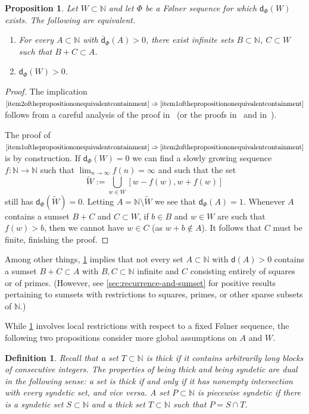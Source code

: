\documentclass[10pt,dvipsnames]{article}
\newtheorem{proposition}[theorem]{Proposition}
\newtheorem{definition}[theorem]{Definition}
\theoremstyle{definition}
\theoremstyle{plain}
\newcommand{\define}[1]{\textit{#1}}
\newcommand{\N}{\mathbb{N}}
\newcommand{\dens}{\mathsf{d}}
\newcommand{\udens}{\overline{\mathsf{d}}}
\newcommand{\Folner}{F\o{}lner}
\begin{document}
\begin{proposition}
\label{prop_B+Cindensity}
Let $W\subset\N$ and let $\Phi$ be a \Folner{} sequence for which $\dens_\Phi(W)$ exists. 
The following are equivalent.
\begin{enumerate}
\item
\label{item1ofthepropositiononequivalentcontainment}
For every $A\subset\N$ with $\udens_\Phi(A)>0$,  there exist infinite sets $B\subset\N$, $C\subset W$ such that $B+C\subset A$.
\item
\label{item2ofthepropositiononequivalentcontainment}
$\dens_\Phi(W)>0$.
\end{enumerate}
\end{proposition}
\begin{proof}
The implication
$
\eqref{item2ofthepropositiononequivalentcontainment}
\Rightarrow
\eqref{item1ofthepropositiononequivalentcontainment}
$
follows from a careful analysis of the proof in~\cite{MRR} (or the proofs in~\cite{Host} and in~\cite{KMRR}).

The proof of
$
\eqref{item1ofthepropositiononequivalentcontainment}
\Rightarrow
\eqref{item2ofthepropositiononequivalentcontainment}
$
is by construction.
If $\dens_\Phi(W)=0$ we can find a slowly growing sequence $f\colon \N\to\N$ such that  $\lim_{n\to\infty}  f(n)=\infty$ and such that the set
\[
\tilde W := \bigcup_{w\in W}[w-f(w),w+f(w)]
\]
still has $\dens_\Phi(\tilde W)=0$.
Letting $A=\N\setminus\tilde W$ we see that $\dens_\Phi(A)=1$.
Whenever $A$ contains a sumset $B+C$ and $C\subset W$, if $b\in B$ and $w\in W$ are such that $f(w)>b$, then we cannot have $w\in C$ (as $w+b\notin A$).
It follows that $C$ must be finite, finishing the proof.
\end{proof}

Among other things, \cref{prop_B+Cindensity} implies that not every set $A\subset\N$ with $\dens(A)>0$ contains a sumset $B+C\subset A$ with $B,C\subset\N$ infinite and $C$ consisting entirely of squares or of primes. 
(However, see \cref{sec:recurrence-and-sumset} for positive results pertaining to sumsets with restrictions to squares, primes, or other sparse subsets of $\N$.)

While \cref{prop_B+Cindensity} involves local restrictions with respect to a fixed \Folner{} sequence, the following two propositions consider more global assumptions on $A$ and $W$.

\begin{definition}
\label{def:thick_synd_ps}
Recall that a set $T\subset\N$ is \define{thick} if it contains arbitrarily long blocks of consecutive integers.
The properties of being thick and being syndetic are dual in the following sense: a set is thick if and only if it has nonempty intersection with every syndetic set, and vice versa.
A set $P \subset \N$ is \define{piecewise syndetic} if there is a syndetic set $S \subset \N$ and a thick set $T \subset \N$ such that $P = S \cap T$.
\end{definition}
\end{document}
